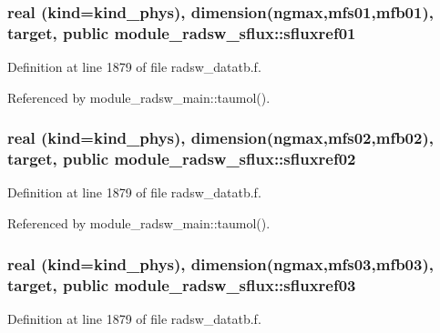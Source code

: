 \subsubsection[{\texorpdfstring{sfluxref01}{sfluxref01}}]{\setlength{\rightskip}{0pt plus 5cm}real (kind=kind\+\_\+phys), dimension(ngmax,{\bf mfs01},{\bf mfb01}), target, public module\+\_\+radsw\+\_\+sflux\+::sfluxref01}\hypertarget{namespacemodule__radsw__sflux_a84205f359fb3e1a0e1d03e755c52dc78}{}\label{namespacemodule__radsw__sflux_a84205f359fb3e1a0e1d03e755c52dc78}


Definition at line 1879 of file radsw\+\_\+datatb.\+f.



Referenced by module\+\_\+radsw\+\_\+main\+::taumol().

\subsubsection[{\texorpdfstring{sfluxref02}{sfluxref02}}]{\setlength{\rightskip}{0pt plus 5cm}real (kind=kind\+\_\+phys), dimension(ngmax,{\bf mfs02},{\bf mfb02}), target, public module\+\_\+radsw\+\_\+sflux\+::sfluxref02}\hypertarget{namespacemodule__radsw__sflux_aa57fca862289bd57327b9c3ef27e3e2f}{}\label{namespacemodule__radsw__sflux_aa57fca862289bd57327b9c3ef27e3e2f}


Definition at line 1879 of file radsw\+\_\+datatb.\+f.



Referenced by module\+\_\+radsw\+\_\+main\+::taumol().

\subsubsection[{\texorpdfstring{sfluxref03}{sfluxref03}}]{\setlength{\rightskip}{0pt plus 5cm}real (kind=kind\+\_\+phys), dimension(ngmax,{\bf mfs03},{\bf mfb03}), target, public module\+\_\+radsw\+\_\+sflux\+::sfluxref03}\hypertarget{namespacemodule__radsw__sflux_a95d2640cf0e6cf0ba4a8ca1758806e48}{}\label{namespacemodule__radsw__sflux_a95d2640cf0e6cf0ba4a8ca1758806e48}


Definition at line 1879 of file radsw\+\_\+datatb.\+f.



